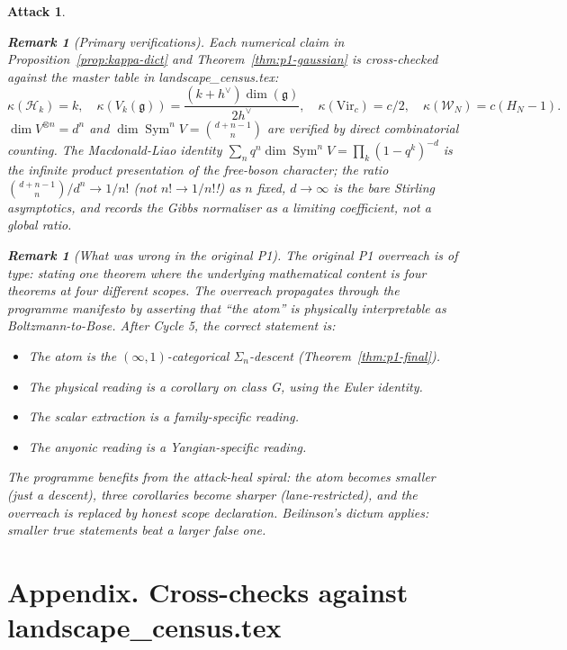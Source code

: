 \documentclass[11pt]{article}
\newtheorem*{attack}{Attack}
\theoremstyle{definition}
\newtheorem{remark}[theorem]{Remark}
\DeclareMathOperator{\Sym}{Sym}
\begin{document}
\begin{attack}
\begin{remark}[Primary verifications]\label{rem:primary-verify}
Each numerical claim in Proposition~\ref{prop:kappa-dict} and
Theorem~\ref{thm:p1-gaussian} is cross-checked against the master
table in landscape\_census.tex:
\[
\kappa(\mathcal H_k) = k,\quad
\kappa(V_k(\mathfrak g)) = \frac{(k+h^\vee)\dim(\mathfrak g)}{2h^\vee},\quad
\kappa(\mathrm{Vir}_c) = c/2,\quad
\kappa(\mathcal W_N) = c(H_N - 1).
\]
$\dim V^{\otimes n} = d^n$ and $\dim \Sym^n V = \binom{d+n-1}{n}$ are
verified by direct combinatorial counting. The Macdonald-Liao identity
$\sum_n q^n \dim \Sym^n V = \prod_k (1 - q^k)^{-d}$ is the infinite
product presentation of the free-boson character; the ratio
$\binom{d+n-1}{n} / d^n \to 1/n!$ (not $n! \to 1/n!$!) as $n$ fixed,
$d \to \infty$ is the bare Stirling asymptotics, and records the
Gibbs normaliser as a limiting coefficient, not a global ratio.
\end{remark}

\begin{remark}[What was wrong in the original P1]\label{rem:original-overreach}
The original P1 \emph{overreach} is of type: stating one theorem where
the underlying mathematical content is four theorems at four different
scopes. The overreach propagates through the programme manifesto by
asserting that ``the atom'' is physically interpretable as
Boltzmann-to-Bose. After Cycle 5, the correct statement is:
\begin{itemize}[leftmargin=1.4em]
\item The atom is the $(\infty,1)$-categorical $\Sigma_n$-descent
(Theorem~\ref{thm:p1-final}).
\item The physical reading is a corollary on class G, using the
Euler identity.
\item The scalar extraction is a family-specific reading.
\item The anyonic reading is a Yangian-specific reading.
\end{itemize}
The programme benefits from the attack-heal spiral: the atom becomes
smaller (just a descent), three corollaries become sharper
(lane-restricted), and the overreach is replaced by honest scope
declaration. Beilinson's dictum applies: smaller true statements
beat a larger false one.
\end{remark}

\section*{Appendix. Cross-checks against landscape\_census.tex}


\end{attack}
\end{document}
